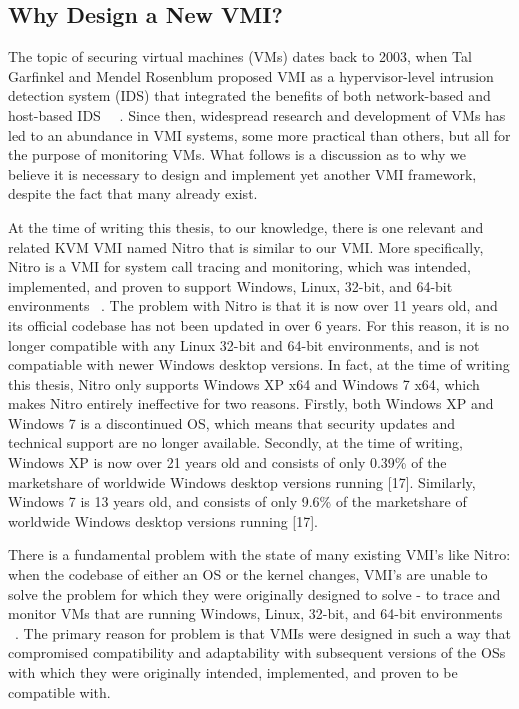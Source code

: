 \documentclass{report}
\begin{document}
\begin{spacing}{1.5}
\subsection{Why Design a New VMI?}

{\large
The topic of securing virtual machines (VMs) dates back to 2003, when Tal Garfinkel and Mendel Rosenblum proposed VMI as a hypervisor-level intrusion detection system (IDS) that integrated the benefits of both network-based and host-based IDS ~\cite{hebbal2015virtual}~\cite{somayaji2002operating}. Since then, widespread research and development of VMs has led to an abundance in VMI systems, some more practical than others, but all for the purpose of monitoring VMs. What follows is a discussion as to why we believe it is necessary to design and implement yet another VMI framework, despite the fact that many already exist.
\newline
}


{\large
At the time of writing this thesis, to our knowledge, there is one relevant and related KVM VMI named Nitro that is similar to our VMI. More specifically, Nitro is a VMI for system call tracing and monitoring, which was intended, implemented, and proven to support Windows, Linux, 32-bit, and 64-bit environments ~\cite{10.1007/978-3-642-25141-2_7}. The problem with Nitro is that it is now over 11 years old, and its official codebase has not been updated in over 6 years. For this reason, it is no longer compatible with any Linux 32-bit and 64-bit environments, and is not compatiable with newer Windows desktop versions. In fact, at the time of writing this thesis, Nitro only supports Windows XP x64 and Windows 7 x64, which makes Nitro entirely ineffective for two reasons. Firstly, both Windows XP and Windows 7 is a discontinued OS, which means that security updates and technical support are no longer available. Secondly, at the time of writing, Windows XP is now over 21 years old and consists of only 0.39\% of the marketshare of worldwide Windows desktop versions running [17]. Similarly, Windows 7 is 13 years old, and consists of only 9.6\% of the marketshare of worldwide Windows desktop versions running [17].
\newline
}

{\large
There is a fundamental problem with the state of many existing VMI's like Nitro: when the codebase of either an OS or the kernel changes, VMI's are unable to solve the problem for which they were originally designed to solve - to trace and monitor VMs that are running Windows, Linux, 32-bit, and 64-bit environments ~\cite{win2014virtual}. The primary reason for problem is that VMIs were designed in such a way that compromised compatibility and adaptability with subsequent versions of the OSs with which they were originally intended, implemented, and proven to be compatible with. 
\newline
}


\end{spacing}
\end{document}

